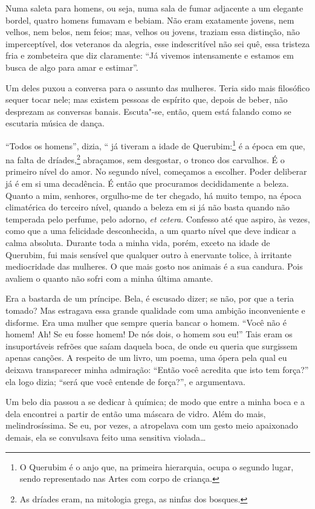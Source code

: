 Numa saleta para homens, ou seja, numa sala de fumar adjacente a um
elegante bordel, quatro homens fumavam e bebiam. Não eram
exatamente jovens, nem velhos, nem belos, nem feios; mas, velhos ou
jovens, traziam essa distinção, não imperceptível, dos veteranos da
alegria, esse indescritível não sei quê, essa tristeza fria e zombeteira
que diz claramente: “Já vivemos intensamente e
estamos em busca de algo para amar e estimar''.

Um deles puxou a conversa para o assunto das mulheres. Teria sido mais
filosófico sequer tocar nele; mas existem pessoas de espírito que,
depois de beber, não desprezam as conversas banais. Escuta"-se, então,
quem está falando como se escutaria música de dança.

“Todos os homens'', dizia, “ já tiveram a idade de
Querubim:\protect\footnote{ O Querubim é o anjo que, na primeira hierarquia, ocupa o segundo
lugar, sendo representado nas Artes com corpo de criança.}
 é a época em que, na falta de
dríades,\protect\footnote{ As dríades eram, na mitologia grega, 
as ninfas dos bosques.} abraçamos, sem desgostar, o tronco dos
carvalhos. É o primeiro nível do amor. No segundo nível, começamos a
escolher. Poder deliberar já é em si uma decadência. É então que procuramos
decididamente a beleza. Quanto a mim, senhores, orgulho-me de ter
chegado, há muito tempo, na época climatérica do terceiro nível, quando
a beleza em si já não basta quando não temperada pelo perfume, pelo
adorno, \textit{et cetera}. Confesso até que aspiro, às vezes, como que a uma
felicidade desconhecida, a um quarto nível que deve indicar a calma
absoluta. Durante toda a minha vida, porém, exceto na idade de Querubim,
fui mais sensível que qualquer outro à enervante tolice, à irritante
mediocridade das mulheres. O que mais gosto nos animais é a sua
candura. Pois avaliem o quanto não sofri com a minha última
amante.

Era a bastarda de um príncipe. Bela, é escusado dizer; se
não, por que a teria tomado? Mas estragava essa grande qualidade
com uma ambição inconveniente e disforme. Era uma mulher que sempre
queria bancar o homem. “Você não é homem! Ah! Se eu
fosse homem! De nós dois, o homem sou eu!'' Tais eram os
insuportáveis refrões que saíam daquela boca, de onde eu queria que surgissem apenas canções. A respeito de um livro, um poema, uma
ópera pela qual eu deixava transparecer minha admiração:
“Então você acredita que isto tem força?'' ela logo dizia; “será que você
entende de força?'', e argumentava.

Um belo dia passou a se dedicar à química; de modo que
entre a minha boca e a dela encontrei a partir de então uma máscara de vidro.
Além do mais, melindrosíssima. Se eu, por vezes, a atropelava com um
gesto meio apaixonado demais, ela se convulsava feito uma sensitiva
violada\ldots\ 


